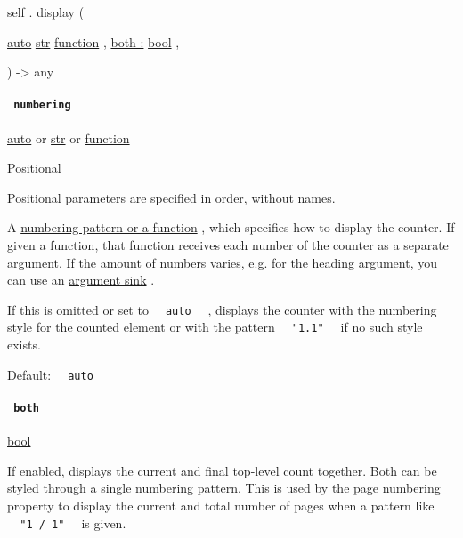 self { . } { display } (

{ \href{/docs/reference/foundations/auto/}{auto}
\href{/docs/reference/foundations/str/}{str}
\href{/docs/reference/foundations/function/}{function} , } {
\hyperref[definitions-display-parameters-both]{both :}
\href{/docs/reference/foundations/bool/}{bool} , }

) -\textgreater{} { any }

\paragraph{\texorpdfstring{\texttt{\ numbering\ }}{ numbering }}\label{definitions-display-numbering}

\href{/docs/reference/foundations/auto/}{auto} {or}
\href{/docs/reference/foundations/str/}{str} {or}
\href{/docs/reference/foundations/function/}{function}

{{ Positional }}

\label{definitions-display-numbering-positional-tooltip}
Positional parameters are specified in order, without names.

A \href{/docs/reference/model/numbering/}{numbering pattern or a
function} , which specifies how to display the counter. If given a
function, that function receives each number of the counter as a
separate argument. If the amount of numbers varies, e.g. for the heading
argument, you can use an
\href{/docs/reference/foundations/arguments/}{argument sink} .

If this is omitted or set to \texttt{\ }{\texttt{\ auto\ }}\texttt{\ } ,
displays the counter with the numbering style for the counted element or
with the pattern \texttt{\ }{\texttt{\ "1.1"\ }}\texttt{\ } if no such
style exists.

Default: \texttt{\ }{\texttt{\ auto\ }}\texttt{\ }

\paragraph{\texorpdfstring{\texttt{\ both\ }}{ both }}\label{definitions-display-both}

\href{/docs/reference/foundations/bool/}{bool}

If enabled, displays the current and final top-level count together.
Both can be styled through a single numbering pattern. This is used by
the page numbering property to display the current and total number of
pages when a pattern like \texttt{\ }{\texttt{\ "1\ /\ 1"\ }}\texttt{\ }
is given.

